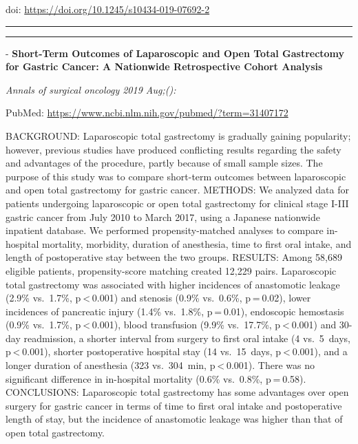 \documentclass[]{article}
\begin{document}
doi: \url{https://doi.org/10.1245/s10434-019-07692-2}

{}

{}

\begin{center}\rule{0.5\linewidth}{\linethickness}\end{center}

\begin{center}\rule{0.5\linewidth}{\linethickness}\end{center}

 - \textbf{Short-Term Outcomes of Laparoscopic and Open Total
Gastrectomy for Gastric Cancer: A Nationwide Retrospective Cohort
Analysis}

\emph{Annals of surgical oncology 2019 Aug;():}

PubMed: \url{https://www.ncbi.nlm.nih.gov/pubmed/?term=31407172}

BACKGROUND: Laparoscopic total gastrectomy is gradually gaining
popularity; however, previous studies have produced conflicting results
regarding the safety and advantages of the procedure, partly because of
small sample sizes. The purpose of this study was to compare short-term
outcomes between laparoscopic and open total gastrectomy for gastric
cancer. METHODS: We analyzed data for patients undergoing laparoscopic
or open total gastrectomy for clinical stage I-III gastric cancer from
July 2010 to March 2017, using a Japanese nationwide inpatient database.
We performed propensity-matched analyses to compare in-hospital
mortality, morbidity, duration of anesthesia, time to first oral intake,
and length of postoperative stay between the two groups. RESULTS: Among
58,689 eligible patients, propensity-score matching created 12,229
pairs. Laparoscopic total gastrectomy was associated with higher
incidences of anastomotic leakage (2.9\% vs.~1.7\%, p \textless{} 0.001)
and stenosis (0.9\% vs.~0.6\%, p = 0.02), lower incidences of pancreatic
injury (1.4\% vs.~1.8\%, p = 0.01), endoscopic hemostasis (0.9\%
vs.~1.7\%, p \textless{} 0.001), blood transfusion (9.9\% vs.~17.7\%,
p \textless{} 0.001) and 30-day readmission, a shorter interval from
surgery to first oral intake (4 vs.~5~days, p \textless{} 0.001),
shorter postoperative hospital stay (14 vs.~15~days,
p \textless{} 0.001), and a longer duration of anesthesia (323
vs.~304~min, p \textless{} 0.001). There was no significant difference
in in-hospital mortality (0.6\% vs.~0.8\%, p = 0.58). CONCLUSIONS:
Laparoscopic total gastrectomy has some advantages over open surgery for
gastric cancer in terms of time to first oral intake and postoperative
length of stay, but the incidence of anastomotic leakage was higher than
that of open total gastrectomy.
\end{document}
